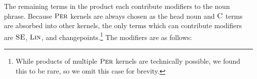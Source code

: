 \documentclass[letterpaper]{article}
\begin{document}

The remaining terms in the product each contribute modifiers to the noun phrase. Because ${\textsc{Per}}$ kernels are always chosen as the head noun and ${\textsc{C}}$ terms are absorbed into other kernels, the only terms which can contribute modifiers are ${\textsc{SE}}$, ${\textsc{Lin}}$, and changepoints.\footnote{While products of multiple ${\textsc{Per}}$ kernels are technically possible, we found this to be rare, so we omit this case for brevity.} The modifiers are as follows:
\end{document}

